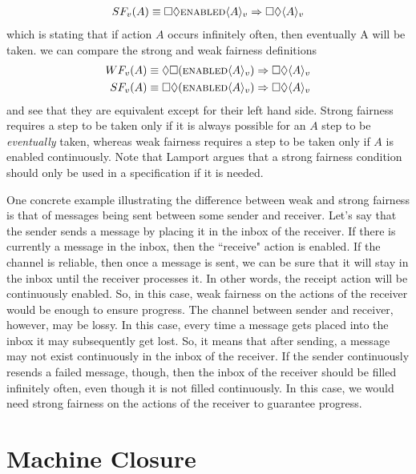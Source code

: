 \documentclass[11pt, oneside]{article}   	%
\begin{document}
\begin{align*}
SF_v(A) \equiv \square \lozenge \textsc{enabled} \langle A \rangle _v \Rightarrow \square \Diamond \langle A \rangle _v
\end{align*}
which is stating that if action $A$ occurs infinitely often, then eventually A will be taken. we can compare the strong and weak fairness definitions
\begin{align*}
WF_v(A) &\equiv 
\Diamond \square (\textsc{enabled} \langle A \rangle _v) \Rightarrow \square \Diamond \langle A \rangle _v \\
SF_v(A) &\equiv \square \lozenge (\textsc{enabled} \langle A \rangle _v ) \Rightarrow \square \Diamond \langle A \rangle _v
\end{align*}
and see that they are equivalent except for their left hand side. Strong fairness requires a step to be taken only if it is always possible for an $A$ step to be \textit{eventually} taken, whereas weak fairness requires a step to be taken only if $A$ is enabled continuously. Note that Lamport argues that a strong fairness condition should only be used in a specification if it is needed.

One concrete example illustrating the difference between weak and strong fairness is that of messages being sent between some sender and receiver. Let's say that the sender sends a message by placing it in the inbox of the receiver. If there is currently a message in the inbox, then the ``receive" action is enabled. If the channel is reliable, then once a message is sent, we can be sure that it will stay in the inbox until the receiver processes it. In other words, the receipt action will be continuously enabled. So, in this case, weak fairness on the actions of the receiver would be enough to ensure progress. The channel between sender and receiver, however, may be lossy. In this case, every time a message gets placed into the inbox it may subsequently get lost. So, it means that after sending, a message may not exist continuously in the inbox of the receiver. If the sender continuously resends a failed message, though, then the inbox of the receiver should be filled infinitely often, even though it is not filled continuously. In this case, we would need strong fairness on the actions of the receiver to guarantee progress.


\section*{Machine Closure}
\end{document}
